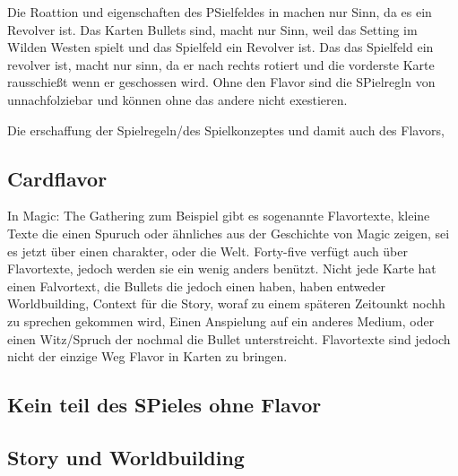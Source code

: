 Die Roattion und eigenschaften des PSielfeldes in \FF machen nur Sinn, da es ein Revolver ist.
Das Karten Bullets sind, macht nur Sinn, weil das Setting im Wilden Westen spielt und das Spielfeld ein Revolver ist.
Das das Spielfeld ein revolver ist, macht nur sinn, da er nach rechts rotiert und die vorderste Karte rausschießt wenn er geschossen wird.
Ohne den Flavor sind die SPielregln von \FF unnachfolziebar und können ohne das andere nicht exestieren.

Die erschaffung der Spielregeln/des Spielkonzeptes und damit auch des Flavors,


%
%



\subsection{Cardflavor}\label{subsec:flavour-durch-mechaniken}


In Magic: The Gathering zum Beispiel
gibt es sogenannte Flavortexte, kleine Texte die einen Spuruch oder ähnliches aus der Geschichte von Magic zeigen, sei es jetzt über einen charakter, oder die Welt.
Forty-five verfügt auch über Flavortexte, jedoch werden sie ein wenig anders benützt. Nicht jede Karte hat einen Falvortext,  die Bullets die jedoch einen haben, haben entweder Worldbuilding,
Context für die Story, woraf zu einem späteren Zeitounkt nochh zu sprechen gekommen wird, Einen Anspielung auf ein anderes Medium, oder einen Witz/Spruch der nochmal
die Bullet unterstreicht. Flavortexte sind jedoch nicht der einzige Weg Flavor in Karten zu bringen.


\subsection{Kein teil des SPieles ohne Flavor}\label{subsec:flavour-durch-mechaniken}

\subsection{Story und Worldbuilding}\label{subsec:flavour-durch-mechaniken}


\renewcommand{\kapitelautor}{}
